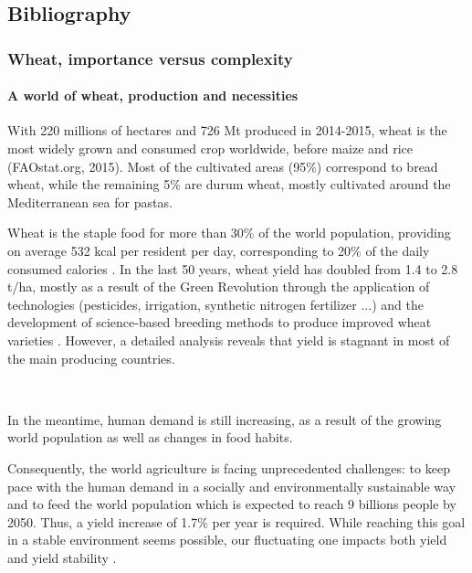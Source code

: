 \documentclass[a4paper, 12pt]{article}
\begin{document}
\begin{onehalfspace}
\part{Bibliography}

    \section{Wheat, importance versus complexity}

        \subsection{A world of wheat, production and necessities}

With 220 millions of hectares and 726 Mt produced in 2014-2015, wheat is the most widely grown and consumed crop worldwide, before maize and rice (FAOstat.org, 2015). Most of the cultivated areas (95\%) correspond to bread wheat, while the remaining 5\% are durum wheat, mostly cultivated around the Mediterranean sea for pastas.

Wheat is the staple food for more than 30\% of the world population, providing on average 532 kcal per resident per day, corresponding to 20\% of the daily consumed calories \citep{Hawkesford2013}. In the last 50 years, wheat yield has doubled from 1.4 to 2.8 t/ha, mostly as a result of the Green Revolution through the application of technologies (pesticides, irrigation, synthetic nitrogen fertilizer ...) and the development of science-based breeding methods to produce improved wheat varieties \citep{Evenson2003}. However, a detailed analysis reveals that yield is stagnant in most of the main producing countries. 

\newpage %
\thispagestyle{empty}
~
\addtocounter{page}{-1}
\newpage
\clearpage %

In the meantime, human demand is still increasing, as a result of the growing world population as well as changes in food habits.

Consequently, the world agriculture is facing unprecedented challenges: to keep pace with the human demand in a socially and environmentally sustainable way \citep{Godfray2010} and to feed the world population which is expected to reach 9 billions people by 2050. Thus, a yield increase of 1.7\% per year is required. While reaching this goal in a stable environment seems possible, our fluctuating one impacts both yield and yield stability \citep{Tester2010}. 


\end{onehalfspace}
\end{document}
